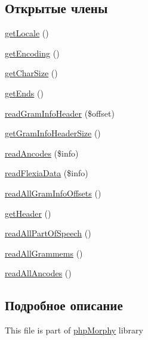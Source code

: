 \subsection*{Открытые члены}
\begin{DoxyCompactItemize}
\item 
\hyperlink{interfacephpMorphy__GramInfo__Interace_af1097bd5a3970e81b16bffcb033f0018}{getLocale} ()
\item 
\hyperlink{interfacephpMorphy__GramInfo__Interace_ac63a757daf416ede72624f4064db9176}{getEncoding} ()
\item 
\hyperlink{interfacephpMorphy__GramInfo__Interace_afeb0d30d02e34c20134f47ce99b45deb}{getCharSize} ()
\item 
\hyperlink{interfacephpMorphy__GramInfo__Interace_a42c172f19abc725b09bc65b872bba20d}{getEnds} ()
\item 
\hyperlink{interfacephpMorphy__GramInfo__Interace_a2bb2d5b7e8a2898542d638a1b2eefc19}{readGramInfoHeader} (\$offset)
\item 
\hyperlink{interfacephpMorphy__GramInfo__Interace_a9afa9616a24c163289a2df924320aa07}{getGramInfoHeaderSize} ()
\item 
\hyperlink{interfacephpMorphy__GramInfo__Interace_aade433f7c59120a9903bfc4d254ae629}{readAncodes} (\$info)
\item 
\hyperlink{interfacephpMorphy__GramInfo__Interace_a9645139683b3b2784479d1a697bddc31}{readFlexiaData} (\$info)
\item 
\hyperlink{interfacephpMorphy__GramInfo__Interace_aec1ab68af0387936b3ef0490bfef476e}{readAllGramInfoOffsets} ()
\item 
\hyperlink{interfacephpMorphy__GramInfo__Interace_a979cffb31fd901a50b55219d2d8353bf}{getHeader} ()
\item 
\hyperlink{interfacephpMorphy__GramInfo__Interace_a3d67913bec52216bfd3bc82184326044}{readAllPartOfSpeech} ()
\item 
\hyperlink{interfacephpMorphy__GramInfo__Interace_a621f72c5673006994cdd0ba684ee54d7}{readAllGrammems} ()
\item 
\hyperlink{interfacephpMorphy__GramInfo__Interace_a5b0b55c86db180b14d04e3b37f207d28}{readAllAncodes} ()
\end{DoxyCompactItemize}


\subsection{Подробное описание}
This file is part of \hyperlink{classphpMorphy}{phpMorphy} library

